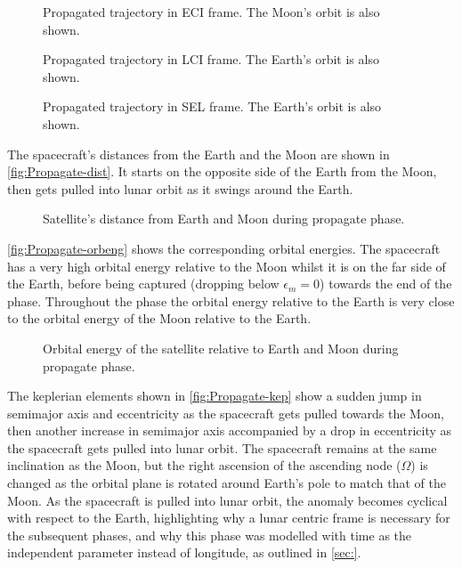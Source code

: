 \begin{figure}
\centering
\def\svgwidth{\figurewidth}

\caption{Propagated trajectory in ECI frame. The Moon's orbit is also shown.}
\label{fig:Propagate-3D}
\end{figure}

\begin{figure}
\centering
\def\svgwidth{\figurewidth}

\caption{Propagated trajectory in LCI frame. The Earth's orbit is also shown.}
\label{fig:Propagate-3D-lci}
\end{figure}

\begin{figure}
\centering
\def\svgwidth{\figurewidth}

\caption{Propagated trajectory in SEL frame. The Earth's orbit is also shown.}
\label{fig:Propagate-3D-sel}
\end{figure}

The spacecraft's distances from the Earth and the Moon are shown in \autoref{fig:Propagate-dist}. It starts on the opposite side of the Earth from the Moon, then gets pulled into lunar orbit as it swings around the Earth. 

\begin{figure}
\centering
\def\svgwidth{\figurewidth}

\caption{Satellite's distance from Earth and Moon during propagate phase.}
\label{fig:Propagate-dist}
\end{figure}

\autoref{fig:Propagate-orbeng} shows the corresponding orbital energies. The spacecraft has a very high orbital energy relative to the Moon whilst it is on the far side of the Earth, before being captured (dropping below $\epsilon_m=0$) towards the end of the phase. Throughout the phase the orbital energy relative to the Earth is very close to the orbital energy of the Moon relative to the Earth.

\begin{figure}
\centering
\def\svgwidth{\figurewidth}

\caption{Orbital energy of the satellite relative to Earth and Moon during propagate phase.}
\label{fig:Propagate-orbeng}
\end{figure}

The keplerian elements shown in \autoref{fig:Propagate-kep} show a sudden jump in semimajor axis and eccentricity as the spacecraft gets pulled towards the Moon, then another increase in semimajor axis accompanied by a drop in eccentricity as the spacecraft gets pulled into lunar orbit. The spacecraft remains at the same inclination as the Moon, but the right ascension of the ascending node ($\Omega$) is changed as the orbital plane is rotated around Earth's pole to match that of the Moon. As the spacecraft is pulled into lunar orbit, the anomaly becomes cyclical with respect to the Earth, highlighting why a lunar centric frame is necessary for the subsequent phases, and why this phase was modelled with time as the independent parameter instead of longitude, as outlined in \autoref{sec:}.


